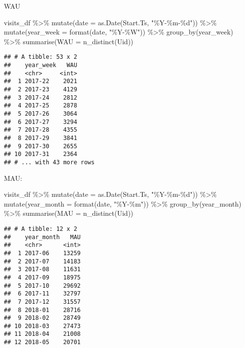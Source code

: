 \documentclass[
]{article}
\newenvironment{Shaded}{\begin{snugshade}}{\end{snugshade}}
\newcommand{\AttributeTok}[1]{\textcolor[rgb]{0.77,0.63,0.00}{#1}}
\newcommand{\FunctionTok}[1]{\textcolor[rgb]{0.00,0.00,0.00}{#1}}
\newcommand{\NormalTok}[1]{#1}
\newcommand{\SpecialCharTok}[1]{\textcolor[rgb]{0.00,0.00,0.00}{#1}}
\newcommand{\StringTok}[1]{\textcolor[rgb]{0.31,0.60,0.02}{#1}}
\begin{document}
WAU

\begin{Shaded}
\begin{Highlighting}[]
\NormalTok{visits\_df }\SpecialCharTok{\%\textgreater{}\%} 
  \FunctionTok{mutate}\NormalTok{(}\AttributeTok{date =} \FunctionTok{as.Date}\NormalTok{(Start.Ts, }\StringTok{"\%Y{-}\%m{-}\%d"}\NormalTok{)) }\SpecialCharTok{\%\textgreater{}\%} 
  \FunctionTok{mutate}\NormalTok{(}\AttributeTok{year\_week =} \FunctionTok{format}\NormalTok{(date, }\StringTok{"\%Y{-}\%W"}\NormalTok{))  }\SpecialCharTok{\%\textgreater{}\%} 
  \FunctionTok{group\_by}\NormalTok{(year\_week) }\SpecialCharTok{\%\textgreater{}\%} 
  \FunctionTok{summarise}\NormalTok{(}\AttributeTok{WAU =} \FunctionTok{n\_distinct}\NormalTok{(Uid))}
\end{Highlighting}
\end{Shaded}

\begin{verbatim}
## # A tibble: 53 x 2
##    year_week   WAU
##    <chr>     <int>
##  1 2017-22    2021
##  2 2017-23    4129
##  3 2017-24    2812
##  4 2017-25    2878
##  5 2017-26    3064
##  6 2017-27    3294
##  7 2017-28    4355
##  8 2017-29    3841
##  9 2017-30    2655
## 10 2017-31    2364
## # ... with 43 more rows
\end{verbatim}

MAU:

\begin{Shaded}
\begin{Highlighting}[]
\NormalTok{visits\_df }\SpecialCharTok{\%\textgreater{}\%} 
  \FunctionTok{mutate}\NormalTok{(}\AttributeTok{date =} \FunctionTok{as.Date}\NormalTok{(Start.Ts, }\StringTok{"\%Y{-}\%m{-}\%d"}\NormalTok{)) }\SpecialCharTok{\%\textgreater{}\%} 
  \FunctionTok{mutate}\NormalTok{(}\AttributeTok{year\_month =} \FunctionTok{format}\NormalTok{(date, }\StringTok{"\%Y{-}\%m"}\NormalTok{))  }\SpecialCharTok{\%\textgreater{}\%} 
  \FunctionTok{group\_by}\NormalTok{(year\_month) }\SpecialCharTok{\%\textgreater{}\%} 
  \FunctionTok{summarise}\NormalTok{(}\AttributeTok{MAU =} \FunctionTok{n\_distinct}\NormalTok{(Uid))}
\end{Highlighting}
\end{Shaded}

\begin{verbatim}
## # A tibble: 12 x 2
##    year_month   MAU
##    <chr>      <int>
##  1 2017-06    13259
##  2 2017-07    14183
##  3 2017-08    11631
##  4 2017-09    18975
##  5 2017-10    29692
##  6 2017-11    32797
##  7 2017-12    31557
##  8 2018-01    28716
##  9 2018-02    28749
## 10 2018-03    27473
## 11 2018-04    21008
## 12 2018-05    20701
\end{verbatim}
\end{document}
